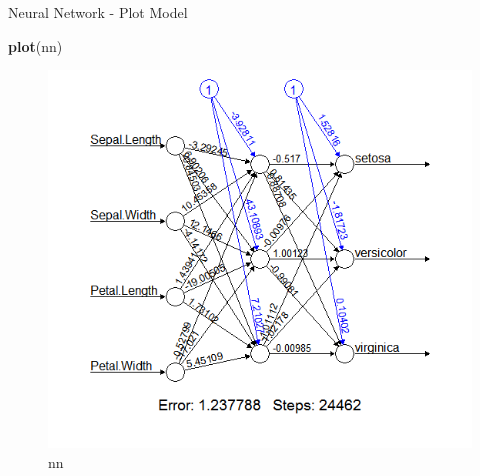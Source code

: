\documentclass[ignorenonframetext,]{beamer}
\newenvironment{Shaded}{\begin{snugshade}}{\end{snugshade}}
\newcommand{\KeywordTok}[1]{\textcolor[rgb]{0.13,0.29,0.53}{\textbf{{#1}}}}
\newcommand{\NormalTok}[1]{{#1}}
\begin{document}
\begin{frame}[fragile]{Neural Network - Plot Model}

\begin{Shaded}
\begin{Highlighting}[]
\KeywordTok{plot}\NormalTok{(nn)}
\end{Highlighting}
\end{Shaded}

\begin{figure}[htbp]
\centering
\includegraphics{nn.png}
\caption{nn}
\end{figure}

\end{frame}
\end{document}
